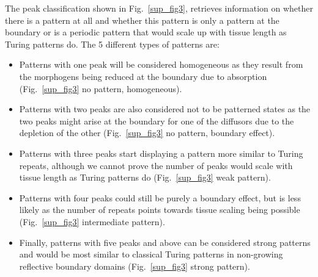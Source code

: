 The peak classification shown in Fig.~\ref{sup_fig3}, retrieves information on whether there is a pattern at all and whether this pattern is only a pattern at the boundary or is a periodic pattern that would scale up with tissue length as Turing patterns do.
The 5 different types of patterns are:
\begin{itemize}
    \item Patterns with one peak will be considered homogeneous as they result from the morphogens being reduced at the boundary due to absorption (Fig.~\ref{sup_fig3} no pattern, homogeneous).
    \item Patterns with two peaks are also considered not to be patterned states as the two peaks might arise at the boundary for one of the diffusors due to the depletion of the other (Fig.~\ref{sup_fig3} no pattern, boundary effect).
    \item Patterns with three peaks start displaying a pattern more similar to Turing repeats, although we cannot prove the number of peaks would scale with tissue length as Turing patterns do (Fig.~\ref{sup_fig3} weak pattern).
    \item Patterns with four peaks could still be purely a boundary effect, but is less likely as the number of repeats points towards tissue scaling being possible (Fig.~\ref{sup_fig3} intermediate pattern).
    \item Finally, patterns with five peaks and above can be considered strong patterns and would be most similar to classical Turing patterns in non-growing reflective boundary domains (Fig.~\ref{sup_fig3} strong pattern).
\end{itemize}


